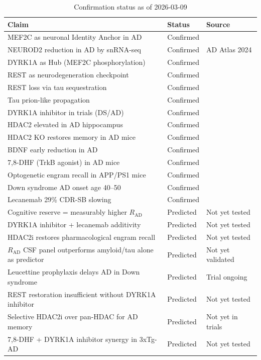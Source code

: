 \documentclass[12pt,a4paper]{article}
\newcommand{\RAD}{R_{\mathrm{AD}}}
\begin{document}
\begin{table}[ht!]
\centering
\caption{Confirmation status as of 2026-03-09}
\label{tab:record}
\begin{tabular}{p{5.5cm}p{2.0cm}p{4.0cm}}
\toprule
\textbf{Claim} &
\textbf{Status} &
\textbf{Source} \\
\midrule
MEF2C as neuronal Identity Anchor
in AD &
Confirmed &
\cite{MolNeuro2024,NatImmuno2025} \\
NEUROD2 reduction in AD
by snRNA-seq &
Confirmed &
AD Atlas 2024 \\
DYRK1A as Hub (MEF2C phosphorylation) &
Confirmed &
\cite{Bhatt2009} \\
REST as neurodegeneration checkpoint &
Confirmed &
\cite{LuRest2014,NatComm2023} \\
REST loss via tau sequestration &
Confirmed &
\cite{Brain2025} \\
Tau prion-like propagation &
Confirmed &
\cite{DeCalignon2012} \\
DYRK1A inhibitor in trials (DS/AD) &
Confirmed &
\cite{Leucettine2022} \\
HDAC2 elevated in AD hippocampus &
Confirmed &
\cite{Ganai2016} \\
HDAC2 KO restores memory in AD mice &
Confirmed &
\cite{Guan2009} \\
BDNF early reduction in AD &
Confirmed &
\cite{Holsinger2000} \\
7,8-DHF (TrkB agonist) in AD mice &
Confirmed &
\cite{Devi2012} \\
Optogenetic engram recall in
APP/PS1 mice &
Confirmed &
\cite{Roy2016} \\
Down syndrome AD onset age 40--50 &
Confirmed &
\cite{Hartley2015} \\
Lecanemab 29\% CDR-SB slowing &
Confirmed &
\cite{Lecanemab2023} \\
\midrule
Cognitive reserve = measurably
higher $\RAD$ &
Predicted &
Not yet tested \\
DYRK1A inhibitor + lecanemab
additivity &
Predicted &
Not yet tested \\
HDAC2i restores pharmacological
engram recall &
Predicted &
Not yet tested \\
$\RAD$ CSF panel outperforms
amyloid/tau alone as predictor &
Predicted &
Not yet validated \\
Leucettine prophylaxis delays AD
in Down syndrome &
Predicted &
Trial ongoing \\
REST restoration insufficient
without DYRK1A inhibitor &
Predicted &
Not yet tested \\
Selective HDAC2i over pan-HDAC
for AD memory &
Predicted &
Not yet in trials \\
7,8-DHF + DYRK1A inhibitor
synergy in 3xTg-AD &
Predicted &
Not yet tested \\
\bottomrule
\end{tabular}
\end{table}
\end{document}
